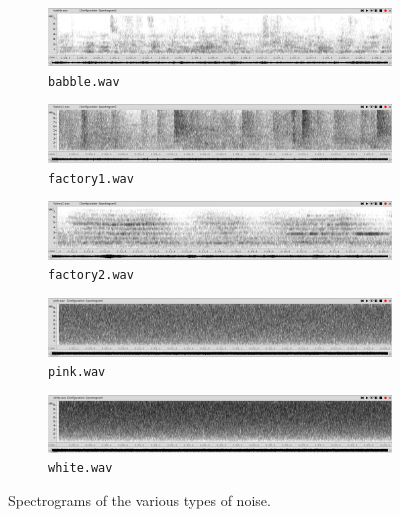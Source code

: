 \documentclass[11pt,a4paper]{report}
\begin{document}
\begin{figure}[htbp]
  \centering
  \begin{subfigure}{\textwidth}
    \includegraphics[width=\textwidth]{babble-spectrogram}
    \caption{\texttt{babble.wav}}
    \label{fig:babble-spectrogram}
  \end{subfigure}

  \begin{subfigure}{\textwidth}
    \includegraphics[width=\textwidth]{factory1-spectrogram}
    \caption{\texttt{factory1.wav}}
    \label{fig:factory1-spectrogram}
  \end{subfigure}

  \begin{subfigure}{\textwidth}
    \includegraphics[width=\textwidth]{factory2-spectrogram}
    \caption{\texttt{factory2.wav}}
    \label{fig:factory2-spectrogram}
  \end{subfigure}

  \begin{subfigure}{\textwidth}
    \includegraphics[width=\textwidth]{pink-spectrogram}
    \caption{\texttt{pink.wav}}
    \label{fig:pink-spectrogram}
  \end{subfigure}

  \begin{subfigure}{\textwidth}
    \includegraphics[width=\textwidth]{white-spectrogram}
    \caption{\texttt{white.wav}}
    \label{fig:white-spectrogram}
  \end{subfigure}

  \caption{Spectrograms of the various types of noise.} \label{fig:noise-spectrogram}
\end{figure}
\end{document}
